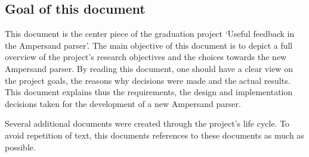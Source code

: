 
\subsection{Goal of this document}
This document is the center piece of the graduation project `Useful feedback in the Ampersand parser'.
The main objective of this document is to depict a full overview of the project's research objectives and the choices towards the new Ampersand parser.
By reading this document, one should have a clear view on the project goals, the reasons why decisions were made and the actual results.
This document explains thus the requirements, the design and implementation decisions taken for the development of a new Ampersand parser.

Several additional documents were created through the project's life cycle.
To avoid repetition of text, this documents references to these documents as much as possible.
